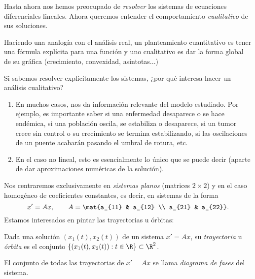 \documentclass[../main.tex]{subfiles}
\begin{document}
Hasta ahora nos hemos preocupado de \emph{resolver} los sistemas de ecuaciones
diferenciales lineales. Ahora queremos entender el comportamiento
\emph{cualitativo} de sus soluciones.

Haciendo una analogía con el análisis real, un planteamiento cuantitativo es
tener una fórmula explícita para una función y uno cualitativo es dar la forma
global de su gráfica (crecimiento, convexidad, asíntotas...)

Si sabemos resolver explícitamente los sistemas, ¿por qué interesa hacer un
análisis cualitativo?

\begin{enumerate}[1)]
\item En muchos casos, nos da información relevante del modelo estudiado. Por
  ejemplo, es importante saber si una enfermedad desaparece o se hace endémica,
  si una población oscila, se estabiliza o desaparece, si un tumor crece sin
  control o su crecimiento se termina estabilizando, si las oscilaciones de un
  puente acabarán pasando el umbral de rotura, etc.
\item En el caso no lineal, esto es esencialmente lo único que se puede decir
  (aparte de dar aproximaciones numéricas de la solución).
\end{enumerate}

Nos centraremos exclusivamente en \emph{sistemas planos} (matrices \(2 \times 2\))
y en el caso homogéneo de coeficientes constantes, es decir, en sistemas de la
forma
\[x' = Ax, \qquad A = \mat{a_{11} & a_{12} \\ a_{21} & a_{22}}.\]
Estamos interesados en pintar las trayectorias u órbitas:

\begin{definition}
  Dada una solución \((x_1(t), x_2(t))\) de un sistema \(x' = Ax\), su
  \emph{trayectoria} u \emph{órbita} es el conjunto
  \(\{(x_1(t), x_2(t)) : t \in \R\} \subset \R^2\).
\end{definition}

\begin{definition}
  El conjunto de todas las trayectorias de \(x' = Ax\) se llama \emph{diagrama
    de fases} del sistema.
\end{definition}
\end{document}
